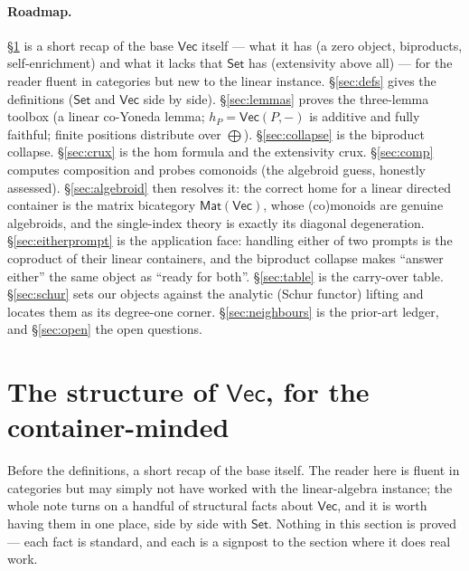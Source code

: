 \documentclass[11pt]{amsart}
\theoremstyle{plain}
\theoremstyle{definition}
\renewcommand{\Vec}{\mathsf{Vec}}
\newcommand{\Set}{\mathsf{Set}}
\newcommand{\Mat}{\mathsf{Mat}}
\newcommand{\bul}{{-}}
\begin{document}
\paragraph{Roadmap.}
\S\ref{sec:vecstructure} is a short recap of the base $\Vec$ itself --- what it has
(a zero object, biproducts, self-enrichment) and what it lacks that $\Set$ has
(extensivity above all) --- for the reader fluent in categories but new to the linear
instance. \S\ref{sec:defs} gives the definitions ($\Set$ and $\Vec$ side by side).
\S\ref{sec:lemmas} proves the three-lemma toolbox (a linear co-Yoneda lemma;
$h_P = \Vec(P,\bul)$ is additive and fully faithful; finite positions
distribute over $\bigoplus$). \S\ref{sec:collapse} is the biproduct collapse.
\S\ref{sec:crux} is the hom formula and the extensivity crux. \S\ref{sec:comp}
computes composition and probes comonoids (the algebroid guess, honestly
assessed). \S\ref{sec:algebroid} then resolves it: the correct home for a linear
directed container is the matrix bicategory $\Mat(\Vec)$, whose (co)monoids are
genuine algebroids, and the single-index theory is exactly its diagonal
degeneration. \S\ref{sec:eitherprompt} is the application face: handling either of two
prompts is the coproduct of their linear containers, and the biproduct collapse makes
``answer either'' the same object as ``ready for both''. \S\ref{sec:table} is the
carry-over table. \S\ref{sec:schur} sets our
objects against the analytic (Schur functor) lifting and locates them as its
degree-one corner. \S\ref{sec:neighbours} is the prior-art ledger, and
\S\ref{sec:open} the open questions.

\section{The structure of $\Vec$, for the container-minded}\label{sec:vecstructure}

Before the definitions, a short recap of the base itself. The reader here is fluent
in categories but may simply not have worked with the linear-algebra instance; the
whole note turns on a handful of structural facts about $\Vec$, and it is worth
having them in one place, side by side with $\Set$. Nothing in this section is
proved --- each fact is standard, and each is a signpost to the section where it does
real work.
\end{document}
